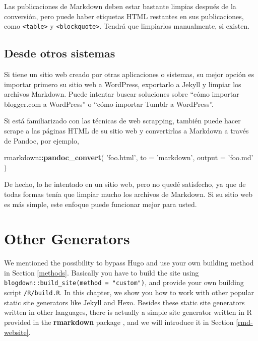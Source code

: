 \documentclass[12pt,]{krantz}
\makeatletter
\newenvironment{Shaded}{\begin{snugshade}}{\end{snugshade}}
\newcommand{\DataTypeTok}[1]{\textcolor[rgb]{0.13,0.29,0.53}{#1}}
\newcommand{\KeywordTok}[1]{\textcolor[rgb]{0.13,0.29,0.53}{\textbf{#1}}}
\newcommand{\NormalTok}[1]{#1}
\newcommand{\OperatorTok}[1]{\textcolor[rgb]{0.81,0.36,0.00}{\textbf{#1}}}
\newcommand{\StringTok}[1]{\textcolor[rgb]{0.31,0.60,0.02}{#1}}
\newenvironment{kframe}{%
\medskip{}
\setlength{\fboxsep}{.8em}
 \def\at@end@of@kframe{}%
 \ifinner\ifhmode%
  \def\at@end@of@kframe{\end{minipage}}%
  \begin{minipage}{\columnwidth}%
 \fi\fi%
 \def\FrameCommand##1{\hskip\@totalleftmargin \hskip-\fboxsep
 \colorbox{shadecolor}{##1}\hskip-\fboxsep
     \hskip-\linewidth \hskip-\@totalleftmargin \hskip\columnwidth}%
 \MakeFramed {\advance\hsize-\width
   \@totalleftmargin\z@ \linewidth\hsize
   \@setminipage}}%
 {\par\unskip\endMakeFramed%
 \at@end@of@kframe}
\renewenvironment{Shaded}{\begin{kframe}}{\end{kframe}}
\theoremstyle{definition}
\theoremstyle{definition}
\theoremstyle{definition}
\theoremstyle{remark}
\makeatother
\begin{document}
Las publicaciones de Markdown deben estar bastante limpias después de la
conversión, pero puede haber etiquetas HTML restantes en sus
publicaciones, como \texttt{\textless{}table\textgreater{}} y
\texttt{\textless{}blockquote\textgreater{}}. Tendrá que limpiarlos
manualmente, si existen.

\hypertarget{desde-otros-sistemas}{%
\section{Desde otros sistemas}\label{desde-otros-sistemas}}

Si tiene un sitio web creado por otras aplicaciones o sistemas, su mejor
opción es importar primero su sitio web a WordPress, exportarlo a Jekyll
y limpiar los archivos Markdown. Puede intentar buscar soluciones sobre
``cómo importar blogger.com a WordPress'' o ``cómo importar Tumblr a
WordPress''.

Si está familiarizado con las técnicas de web scrapping, también puede
hacer scrape a las páginas HTML de su sitio web y convertirlas a
Markdown a través de Pandoc, por ejemplo,

\begin{Shaded}
\begin{Highlighting}[]
\NormalTok{rmarkdown}\OperatorTok{::}\KeywordTok{pandoc_convert}\NormalTok{(}
  \StringTok{'foo.html'}\NormalTok{, }\DataTypeTok{to =} \StringTok{'markdown'}\NormalTok{, }\DataTypeTok{output =} \StringTok{'foo.md'}
\NormalTok{)}
\end{Highlighting}
\end{Shaded}

De hecho, lo he intentado en un sitio web, pero no quedé satisfecho, ya
que de todas formas tenía que limpiar mucho los archivos de Markdown. Si
su sitio web es más simple, este enfoque puede funcionar mejor para
usted.

\hypertarget{other-generators}{%
\chapter{Other Generators}\label{other-generators}}

We mentioned the possibility to bypass Hugo and use your own building
method in Section \ref{methods}. Basically you have to build the site
using \texttt{blogdown::build\_site(method\ =\ "custom")}, and provide
your own building script \texttt{/R/build.R}. In this chapter, we show
you how to work with other popular static site generators like Jekyll
and Hexo. Besides these static site generators written in other
languages, there is actually a simple site generator written in R
provided in the \textbf{rmarkdown} package \citep{R-rmarkdown}, and we
will introduce it in Section \ref{rmd-website}.
\end{document}
